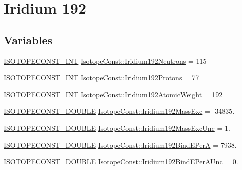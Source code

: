 \hypertarget{group___isotope_const-_iridium-_ir192}{}\section{Iridium 192}
\label{group___isotope_const-_iridium-_ir192}
\subsection*{Variables}
\begin{DoxyCompactItemize}
\item 
\mbox{\hyperlink{group___isotope_const-_macros_ga5f18360b3e99483a35c32d789e62621c}{I\+S\+O\+T\+O\+P\+E\+C\+O\+N\+S\+T\+\_\+\+I\+NT}} \mbox{\hyperlink{group___isotope_const-_iridium-_ir192_ga09a0301a0d85bca0936b4c30c6112030}{Isotope\+Const\+::\+Iridium192\+Neutrons}} = 115
\item 
\mbox{\hyperlink{group___isotope_const-_macros_ga5f18360b3e99483a35c32d789e62621c}{I\+S\+O\+T\+O\+P\+E\+C\+O\+N\+S\+T\+\_\+\+I\+NT}} \mbox{\hyperlink{group___isotope_const-_iridium-_ir192_ga109ac737e9d24196c151a6da33feaf2f}{Isotope\+Const\+::\+Iridium192\+Protons}} = 77
\item 
\mbox{\hyperlink{group___isotope_const-_macros_ga5f18360b3e99483a35c32d789e62621c}{I\+S\+O\+T\+O\+P\+E\+C\+O\+N\+S\+T\+\_\+\+I\+NT}} \mbox{\hyperlink{group___isotope_const-_iridium-_ir192_ga75012668ef07c5a37ae57e47016bc455}{Isotope\+Const\+::\+Iridium192\+Atomic\+Weight}} = 192
\item 
\mbox{\hyperlink{group___isotope_const-_macros_ga8f45a7272ce02c0b4c65c44636ed719a}{I\+S\+O\+T\+O\+P\+E\+C\+O\+N\+S\+T\+\_\+\+D\+O\+U\+B\+LE}} \mbox{\hyperlink{group___isotope_const-_iridium-_ir192_ga377fb679331a390164107a97a64a8d04}{Isotope\+Const\+::\+Iridium192\+Mass\+Exc}} = -\/34835.
\item 
\mbox{\hyperlink{group___isotope_const-_macros_ga8f45a7272ce02c0b4c65c44636ed719a}{I\+S\+O\+T\+O\+P\+E\+C\+O\+N\+S\+T\+\_\+\+D\+O\+U\+B\+LE}} \mbox{\hyperlink{group___isotope_const-_iridium-_ir192_ga4721323beabf88be58fc197cf09fa3db}{Isotope\+Const\+::\+Iridium192\+Mass\+Exc\+Unc}} = 1.
\item 
\mbox{\hyperlink{group___isotope_const-_macros_ga8f45a7272ce02c0b4c65c44636ed719a}{I\+S\+O\+T\+O\+P\+E\+C\+O\+N\+S\+T\+\_\+\+D\+O\+U\+B\+LE}} \mbox{\hyperlink{group___isotope_const-_iridium-_ir192_ga143ddfe1d6071a288d705c99a314875a}{Isotope\+Const\+::\+Iridium192\+Bind\+E\+PerA}} = 7938.
\item 
\mbox{\hyperlink{group___isotope_const-_macros_ga8f45a7272ce02c0b4c65c44636ed719a}{I\+S\+O\+T\+O\+P\+E\+C\+O\+N\+S\+T\+\_\+\+D\+O\+U\+B\+LE}} \mbox{\hyperlink{group___isotope_const-_iridium-_ir192_ga250b92d7f66951015742eca9b0911b79}{Isotope\+Const\+::\+Iridium192\+Bind\+E\+Per\+A\+Unc}} = 0.

\end{DoxyCompactItemize}
